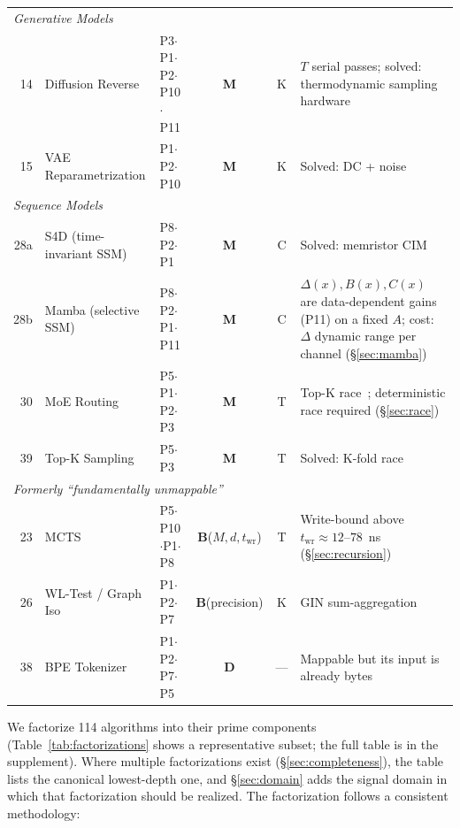 \documentclass[11pt]{article}
\begin{document}
\begin{table}[t]
\begin{tabular}{rllccp{4.5cm}}
\midrule
\multicolumn{6}{l}{\textit{Generative Models}} \\
14 & Diffusion Reverse & P3$\cdot$P1$\cdot$P2$\cdot$P10$\cdot$P11 & \textbf{M} & K & $T$ serial passes; solved: thermodynamic sampling hardware~\cite{extropic2025} \\
15 & VAE Reparametrization & P1$\cdot$P2$\cdot$P10 & \textbf{M} & K & Solved: DC + noise~\cite{bieg2026sba} \\
\midrule
\multicolumn{6}{l}{\textit{Sequence Models}} \\
28a & S4D (time-invariant SSM) & P8$\cdot$P2$\cdot$P1 & \textbf{M} & C & Solved: memristor CIM~\cite{zhang2026ssm} \\
28b & Mamba (selective SSM) & P8$\cdot$P2$\cdot$P1$\cdot$P11 & \textbf{M} & C & $\Delta(x),B(x),C(x)$ are data-dependent gains (P11) on a fixed $A$; cost: $\Delta$ dynamic range per channel (\S\ref{sec:mamba}) \\
30 & MoE Routing & P5$\cdot$P1$\cdot$P2$\cdot$P3 & \textbf{M} & T & Top-K race~\cite{bieg2026sba}; deterministic race required (\S\ref{sec:race}) \\
39 & Top-K Sampling & P5$\cdot$P3 & \textbf{M} & T & Solved: K-fold race~\cite{bieg2026} \\
\midrule
\multicolumn{6}{l}{\textit{Formerly ``fundamentally unmappable''}} \\
23 & MCTS & P5$\cdot$P10$\cdot$P1$\cdot$P8 & \textbf{B}($M,d,t_{\mathrm{wr}}$) & T & Write-bound above $t_{\mathrm{wr}}\approx12$--$78$~ns (\S\ref{sec:recursion}) \\
26 & WL-Test / Graph Iso & P1$\cdot$P2$\cdot$P7 & \textbf{B}(precision) & K & GIN sum-aggregation~\cite{xu2019gin} \\
38 & BPE Tokenizer & P1$\cdot$P2$\cdot$P7$\cdot$P5 & \textbf{D} & --- & Mappable but its input is already bytes \\
\bottomrule
\end{tabular}
\end{table}

We factorize 114 algorithms into their prime components (Table~\ref{tab:factorizations} shows a representative subset; the full table is in the supplement). Where multiple factorizations exist (\S\ref{sec:completeness}), the table lists the canonical lowest-depth one, and \S\ref{sec:domain} adds the signal domain in which that factorization should be realized. The factorization follows a consistent methodology:
\end{document}
